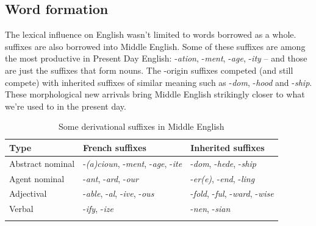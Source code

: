 \subsection{Word formation}

The  lexical influence on English wasn't limited to words borrowed as a whole.  suffixes are also borrowed into Middle English. Some of these suffixes are among the most productive in Present Day English: -\emph{ation}, \mbox{-\emph{ment}}, -\emph{age}, -\emph{ity} -- and those are just the suffixes that form nouns. The -origin suffixes competed (and still compete) with inherited suffixes of similar meaning such as -\emph{dom}, -\emph{hood} and -\emph{ship}. These morphological new arrivals bring Middle English strikingly closer to what we're used to in the present day.

\begin{table}
    \caption{Some derivational suffixes in Middle English}\label{tab:ME-suffixes}
  \begin{tabular}{lll}
    \lsptoprule
    Type & French suffixes & Inherited suffixes \\
    \midrule
    Abstract nominal & -\emph{(a)cioun}, -\emph{ment}, -\emph{age}, -\emph{ite} & -\emph{dom}, -\emph{hede}, -\emph{ship} \\
    Agent nominal & -\emph{ant}, -\emph{ard}, -\emph{our} & -\emph{er(e)}, -\emph{end}, -\emph{ling} \\
    Adjectival & -\emph{able}, -\emph{al}, -\emph{ive}, -\emph{ous} & -\emph{fold}, -\emph{ful}, -\emph{ward}, -\emph{wise} \\
    Verbal & -\emph{ify}, -\emph{ize} & -\emph{nen}, -\emph{sian} \\
    \lspbottomrule
  \end{tabular}
\end{table}

